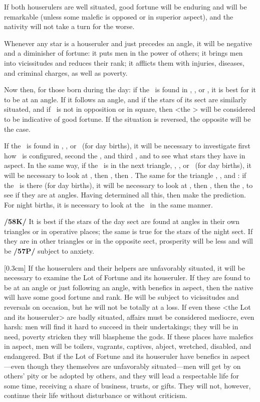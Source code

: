 If both houserulers are well situated, good fortune will be enduring and will be remarkable (unless some malefic is opposed or in superior aspect), and the nativity will not take a turn for the worse. 

Whenever any star is a houseruler and just precedes an angle, it will be negative and a diminisher of fortune: it puts men in the power of others; it brings men into vicissitudes and reduces their rank; it afflicts them with injuries, diseases, and criminal charges, as well as poverty.

Now then, for those born during the day: if the \Sun\, is found in \Aries, \Leo, or \Sagittarius, it is best for it to be at an angle. If it follows an angle, and if the stars of its sect are similarly situated, and if \Mars\, is not in opposition or in square, then <the \Sun> will be considered to be indicative of good fortune. If the situation is reversed, the opposite will be the case. 

If the \Sun\, is found in \Taurus, \Virgo, or \Capricorn\, (for day births), it will be necessary to investigate first how \Venus\, is configured, second the \Moon, and third \Mars, and to see what stars they have in aspect. In the same way, if the \Sun\, is in the next triangle, \Gemini, \Libra, or \Aquarius\, (for day births), it will be necessary to look at \Saturn, then \Mercury, then \Jupiter. The same for the triangle \Cancer, \Scorpio, and \Pisces: if the \Sun\, is there (for day births), it will be necessary to look at \Venus, then \Mars, then the \Moon, to see if they are at angles. Having determined all this, then make the prediction. For night births, it is necessary to look at the \Moon\, in the same manner.

\mndl[0.2cm] 
\textbf{/58K/} It is best if the stars of the day sect are found at angles in their own triangles or in operative places; the same is true for the stars of the night sect. If they are in other triangles or in the opposite sect, prosperity will be less and will be \textbf{/57P/} subject to anxiety. 

\marginnote{\Fortune}[0.3cm] 
If the houserulers and their helpers are unfavorably situated, it will be necessary to examine the Lot of Fortune and its houseruler. If they are found to be at an angle or just following an angle, with benefics in aspect, then the native will have some good fortune and rank. He will be subject to vicissitudes and reversals on occasion, but he will not be
totally at a loss. If even these <the Lot and its houseruler> are badly situated, affairs must be considered mediocre, even harsh: men will find it hard to succeed in their undertakings; they will be in need, poverty stricken they will blaspheme the gods. If these places have malefics in aspect, men will be toilers, vagrants, captives, abject, wretched, disabled, and endangered. But if the Lot of Fortune and its houseruler have benefics in aspect—even though they themselves are unfavorably situated—men will get by on others’ pity or be adopted by others, and they will lead a respectable life for some time, receiving a share of business, trusts, or gifts. They will not, however, continue their life without disturbance or without criticism.

